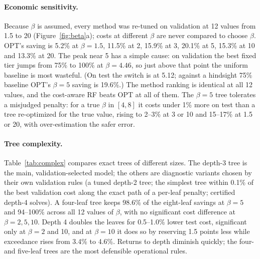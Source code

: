 \documentclass[10pt]{article}
\begin{document}
\paragraph{Economic sensitivity.} Because $\beta$ is assumed, every method was re-tuned on validation at 12 values from 1.5 to 20 (Figure~\ref{fig:beta}a); costs at different $\beta$ are never compared to choose $\beta$. OPT's saving is 5.2\% at $\beta=1.5$, 11.5\% at 2, 15.9\% at 3, 20.1\% at 5, 15.3\% at 10 and 13.3\% at 20. The peak near 5 has a simple cause: on validation the best fixed tier jumps from 75\% to 100\% at $\beta=4.46$, so just above that point the uniform baseline is most wasteful. (On test the switch is at 5.12; against a hindsight 75\% baseline OPT's $\beta=5$ saving is 19.6\%.) The method ranking is identical at all 12 values, and the cost-aware RF beats OPT at all of them. The $\beta=5$ tree tolerates a misjudged penalty: for a true $\beta$ in $[4,8]$ it costs under 1\% more on test than a tree re-optimized for the true value, rising to 2--3\% at 3 or 10 and 15--17\% at 1.5 or 20, with over-estimation the safer error.

\paragraph{Tree complexity.} Table~\ref{tab:complex} compares exact trees of different sizes. The depth-3 tree is the main, validation-selected model; the others are diagnostic variants chosen by their own validation rules (a tuned depth-2 tree; the simplest tree within 0.1\% of the best validation cost along the exact path of a per-leaf penalty; certified depth-4 solves). A four-leaf tree keeps 98.6\% of the eight-leaf savings at $\beta=5$ and 94--100\% across all 12 values of $\beta$, with no significant cost difference at $\beta=2,5,10$. Depth 4 doubles the leaves for 0.5--1.0\% lower test cost, significant only at $\beta=2$ and 10, and at $\beta=10$ it does so by reserving 1.5 points less while exceedance rises from 3.4\% to 4.6\%. Returns to depth diminish quickly; the four- and five-leaf trees are the most defensible operational rules.
\end{document}
